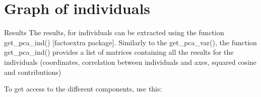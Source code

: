\documentclass[]{book}
\newenvironment{Shaded}{\begin{snugshade}}{\end{snugshade}}
\newcommand{\CommentTok}[1]{\textcolor[rgb]{0.56,0.35,0.01}{\textit{#1}}}
\newcommand{\KeywordTok}[1]{\textcolor[rgb]{0.13,0.29,0.53}{\textbf{#1}}}
\newcommand{\NormalTok}[1]{#1}
\newcommand{\StringTok}[1]{\textcolor[rgb]{0.31,0.60,0.02}{#1}}
\begin{document}
\hypertarget{graph-of-individuals}{%
\section{Graph of individuals}\label{graph-of-individuals}}

Results
The results, for individuals can be extracted using the function get\_pca\_ind() {[}factoextra package{]}. Similarly to the get\_pca\_var(), the function get\_pca\_ind() provides a list of matrices containing all the results for the individuals (coordinates, correlation between individuals and axes, squared cosine and contributions)

\begin{Shaded}
\end{Shaded}

To get access to the different components, use this:
\end{document}
